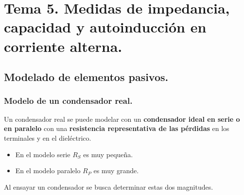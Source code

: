 \section{Tema 5. Medidas de impedancia, capacidad y autoinducción en corriente alterna.}
	\subsection{Modelado de elementos pasivos.}
		\subsubsection{Modelo de un condensador real.}
			Un condensador real se puede modelar con un \textbf{condensador ideal en serie o en paralelo} con una \textbf{resistencia representativa de las pérdidas} en los terminales y en el dieléctrico.
			\begin{itemize}
				\item En el modelo serie $R_S$ es muy pequeña.
				\item En el modelo paralelo $R_P$ es muy grande.
			\end{itemize}
			
			Al ensayar un condensador se busca determinar estas dos magnitudes.
			
